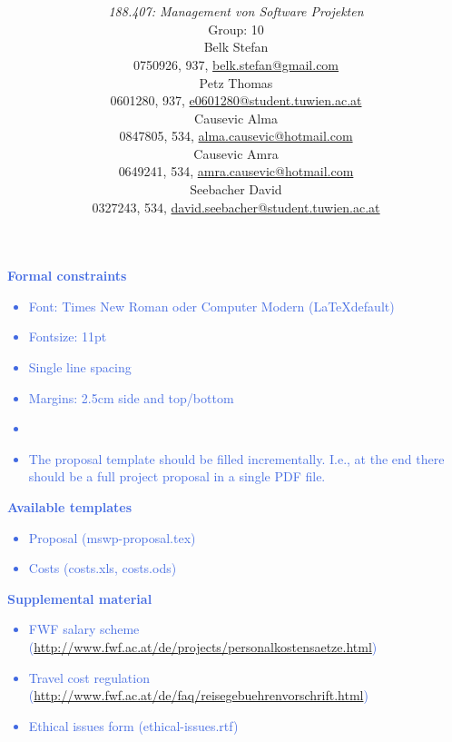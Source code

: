 \documentclass[a4paper,11pt]{article}
\title{\textbf{\sffamily\Huge \ShortTitle}\\ 
{\textbf{\sffamily\Large \FullTitle}}
\vspace{1cm}}
\author{
{\em 188.407: Management von Software Projekten} \vspace{1cm} \\
Group: 10\bigskip \\
Belk Stefan \\ {\small 0750926, 937, \href{mailto:belk.stefan@gmail.com}{belk.stefan@gmail.com}}\\
Petz Thomas \\ {\small 0601280, 937, \href{mailto:e0601280@student.tuwien.ac.at}{e0601280@student.tuwien.ac.at}}\\
Causevic Alma \\ {\small 0847805, 534, \href{mailto:alma.causevic@hotmail.com}{alma.causevic@hotmail.com}}\\ 
Causevic Amra  \\ {\small 0649241, 534, \href{mailto:amra.causevic@hotmail.com}{amra.causevic@hotmail.com}}\\ 
Seebacher David \\ {\small 0327243, 534, \href{mailto:david.seebacher@student.tuwien.ac.at}{david.seebacher@student.tuwien.ac.at}}\\
\vspace{4cm}
}
\providecommand*{\note}[1]{\small \textcolor{RoyalBlue}{\begin{minipage}{\textwidth}{#1}\end{minipage}}}
\begin{document}
\begin{titlepage}
\maketitle

\end{titlepage}


\thispagestyle{empty}
\tableofcontents
\pagebreak

\setcounter{page}{1}



\note{
\textbf{Formal constraints}
\begin{itemize}
\item	  Font: Times New Roman oder Computer Modern (\LaTeX default)
\item    Fontsize: 11pt
\item     Single line spacing
\item     Margins: 2.5cm side and top/bottom
\item     \fbox{Language: ENGLISH}
\item    The proposal template should be filled incrementally. I.e., at the end there should be a full project proposal in a single PDF file.
\end{itemize}
\textbf{Available templates}
\begin{itemize}
\item     Proposal (mswp-proposal.tex)
\item     Costs (costs.xls, costs.ods)
\end{itemize}
\textbf{Supplemental material}
\begin{itemize}
\item     FWF salary scheme (\href{http://www.fwf.ac.at/de/projects/personalkostensaetze.html}{http://www.fwf.ac.at/de/projects/personalkostensaetze.html})
\item     Travel cost regulation (\href{http://www.fwf.ac.at/de/faq/reisegebuehrenvorschrift.html}{http://www.fwf.ac.at/de/faq/reisegebuehrenvorschrift.html})
\item     Ethical issues form (ethical-issues.rtf)
\end{itemize}
}
\pagebreak


\end{document}
